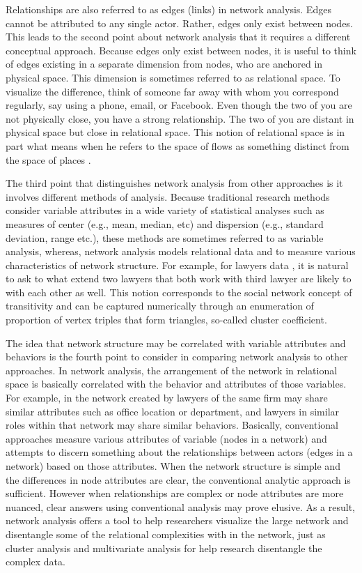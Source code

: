 Relationships are also referred to as edges (links) in network analysis. Edges cannot be attributed to any single actor. Rather, edges only exist between nodes. This leads to the second point about network analysis that it requires a different conceptual approach. Because edges only exist between nodes, it is useful to think of edges existing in a separate dimension from nodes, who are anchored in physical space. This dimension is sometimes referred to as relational space. To visualize the difference, think of someone far away with whom you correspond regularly, say using a phone, email, or Facebook. Even though the two of you are not physically close, you have a strong relationship. The two of you are distant in physical space but close in relational space. This notion of relational space is in part what means when he refers to the space of flows as something distinct from the space of places .

The third point that distinguishes network analysis from other approaches is it involves different methods of analysis. Because traditional research methods consider variable attributes in a wide variety of statistical analyses such as measures of center (e.g., mean, median, etc) and dispersion (e.g., standard deviation, range etc.), these methods are sometimes referred to as variable analysis, whereas, network analysis models relational data and to measure various characteristics of network structure. For example, for lawyers data , it is natural to ask to what extend two lawyers that both work with third lawyer are likely to with  each other as well. This notion corresponds to the social network concept of transitivity and can be captured numerically through an enumeration of proportion of vertex triples that form triangles, so-called cluster coefficient. 


The idea that network structure may be correlated with variable attributes and behaviors is the fourth point to consider in comparing network analysis to other approaches. In network analysis, the arrangement of the network in relational space is basically correlated with the behavior and attributes of those variables. For example, in the network created by  lawyers of the same firm may share similar attributes such as office location or department, and lawyers in similar roles within that network may share similar behaviors. Basically, conventional approaches measure various attributes of variable (nodes in a network) and attempts to discern something about the relationships between actors (edges in a network) based on those attributes. When the network structure is simple and the differences in node attributes are clear, the conventional analytic approach is sufficient. However when relationships are complex or node attributes are more nuanced, clear answers using conventional analysis may prove elusive. As a result, network analysis offers a tool to help researchers visualize the large network and disentangle some of the relational complexities with in the network, just as cluster analysis and multivariate analysis for help research disentangle the complex data.


